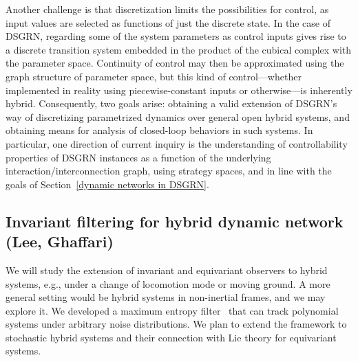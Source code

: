 \documentclass[letterpaper,11pt]{article}
\begin{document}
Another challenge is that discretization limits the possibilities for control, as input values are selected as functions of just the discrete state.
%
In the case of DSGRN, regarding some of the system parameters as control inputs gives rise to a discrete transition system embedded in the product of the cubical complex with the parameter space.
%
Continuity of control may then be approximated using the graph structure of parameter space, but this kind of control---whether implemented in reality using piecewise-constant inputs or otherwise---is inherently hybrid.
%
Consequently, two goals arise: obtaining a valid extension of DSGRN's way of discretizing parametrized dynamics over general open hybrid systems, and obtaining means for analysis of closed-loop behaviors in such systems.
%
In particular, one direction of current inquiry is the understanding of controllability properties of DSGRN instances as a function of the underlying interaction/interconnection graph, using strategy spaces, and in line with the goals of Section~\ref{dynamic networks in DSGRN}.
%

\vspace*{0.3cm}



\subsection{Invariant filtering for hybrid dynamic network (Lee, Ghaffari)}
We will study the extension of invariant and equivariant observers to hybrid systems, e.g., under a change of locomotion mode or moving ground. A more general setting would be hybrid systems in non-inertial frames, and we may explore it. We developed a maximum entropy filter~\cite{teng2025max} that can track polynomial systems under arbitrary noise distributions. We plan to extend the framework to stochastic hybrid systems and their connection with Lie theory for equivariant systems. 
\end{document}
